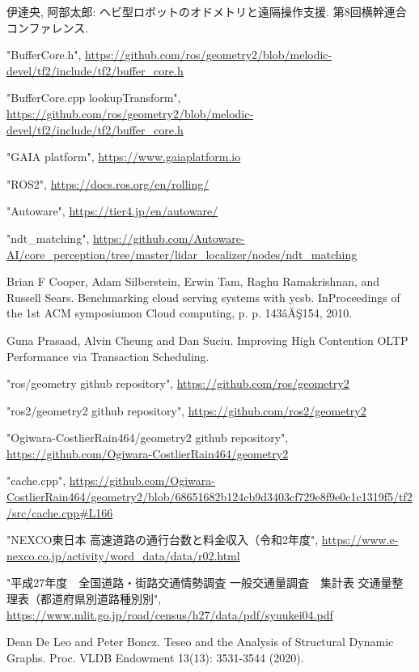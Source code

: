 \documentclass[a4paper]{jreport}	%
\begin{document}
\begin{thebibliography}{99}
 伊達央, 阿部太郎: ヘビ型ロボットのオドメトリと遠隔操作支援. 第8回横幹連合コンファレンス.

 "BufferCore.h", \url{https://github.com/ros/geometry2/blob/melodic-devel/tf2/include/tf2/buffer_core.h}

 "BufferCore.cpp lookupTransform", \url{https://github.com/ros/geometry2/blob/melodic-devel/tf2/include/tf2/buffer_core.h}

 "GAIA platform", \url{https://www.gaiaplatform.io}

 "ROS2", \url{https://docs.ros.org/en/rolling/}

 "Autoware", \url{https://tier4.jp/en/autoware/}

 "ndt\_matching", \url{https://github.com/Autoware-AI/core_perception/tree/master/lidar_localizer/nodes/ndt_matching}

 Brian F Cooper, Adam Silberstein, Erwin Tam, Raghu Ramakrishnan, and Russell Sears. Benchmarking cloud serving systems with ycsb. InProceedings of the 1st ACM symposiumon Cloud computing, p. p. 143âĂŞ154, 2010.

 Guna Prasaad, Alvin Cheung and Dan Suciu. Improving High Contention OLTP Performance via Transaction Scheduling. 

 "ros/geometry github repository", \url{https://github.com/ros/geometry2} 

 "ros2/geometry2 github repository", \url{https://github.com/ros2/geometry2}

 "Ogiwara-CostlierRain464/geometry2 github repository", \url{https://github.com/Ogiwara-CostlierRain464/geometry2}

 "cache.cpp", \url{https://github.com/Ogiwara-CostlierRain464/geometry2/blob/68651682b124cb9d3403cf729e8f9e0c1c1319f5/tf2/src/cache.cpp#L166}

 "NEXCO東日本 高速道路の通行台数と料金収入（令和2年度", \url{https://www.e-nexco.co.jp/activity/word_data/data/r02.html}

 "平成27年度　全国道路・街路交通情勢調査 一般交通量調査　集計表 交通量整理表（都道府県別道路種別別", \url{https://www.mlit.go.jp/road/census/h27/data/pdf/syuukei04.pdf}

 Dean De Leo and Peter Boncz. Teseo and the Analysis of Structural Dynamic Graphs. Proc. VLDB Endowment 13(13): 3531-3544 (2020).

\end{thebibliography}
\end{document}

